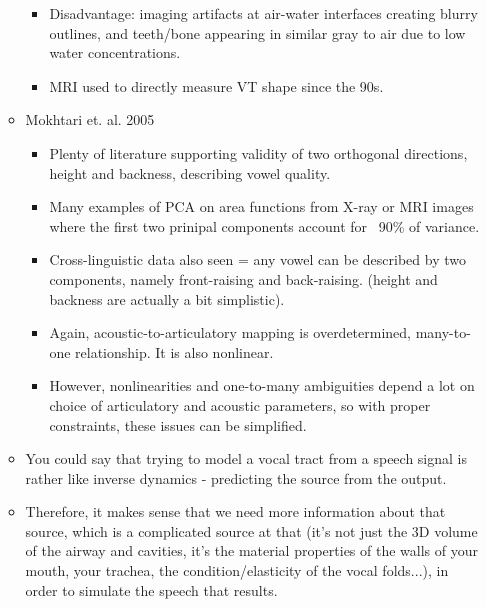 \documentclass{article}
\begin{document}
\begin{itemize}
\begin{itemize}
\begin{itemize}
            \item Disadvantage: imaging artifacts at air-water interfaces creating blurry outlines, and teeth/bone appearing in similar gray to air due to low water concentrations.
            \item MRI used to directly measure VT shape since the 90s.
        \end{itemize}
        \item Mokhtari et. al. 2005
        \begin{itemize}
            \item Plenty of literature supporting validity of two orthogonal directions, height and backness, describing vowel quality.
            \item Many examples of PCA on area functions from X-ray or MRI images where the first two prinipal components account for ~90\% of variance.
            \item Cross-linguistic data also seen = any vowel can be described by two components, namely front-raising and back-raising. (height and backness are actually a bit simplistic).
            \item Again, acoustic-to-articulatory mapping is overdetermined, many-to-one relationship. It is also nonlinear. 
            \item However, nonlinearities and one-to-many ambiguities depend a lot on choice of articulatory and acoustic parameters, so with proper constraints, these issues can be simplified.
        \end{itemize}
        \item You could say that trying to model a vocal tract from a speech signal is rather like inverse dynamics - predicting the source from the output.
        \item Therefore, it makes sense that we need more information about that source, which is a complicated source at that (it's not just the 3D volume of the airway and cavities, it's the material properties of the walls of your mouth, your trachea, the condition/elasticity of the vocal folds...), in order to simulate the speech that results.
    \end{itemize}
\end{itemize}
\end{document}
